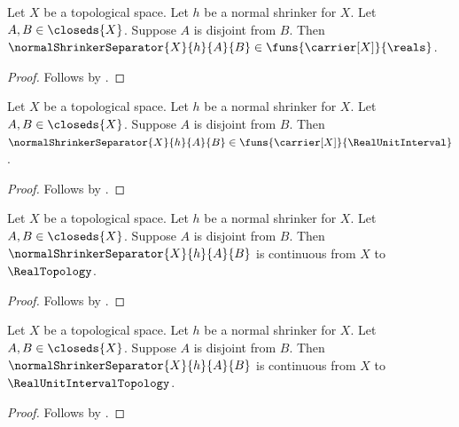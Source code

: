 \begin{theorem}\label{normal_shrinker_separator_typed_real}
    Let $X$ be a topological space.
    Let $h$ be a normal shrinker for $X$.
    Let $A,B\in\closeds{X}$.
    Suppose $A$ is disjoint from $B$.
    Then $\normalShrinkerSeparator{X}{h}{A}{B}
        \in\funs{\carrier[X]}{\reals}$.
\end{theorem}
\begin{proof}
    Follows by
        .
\end{proof}

\begin{theorem}\label{normal_shrinker_separator_typed_unit_interval}
    Let $X$ be a topological space.
    Let $h$ be a normal shrinker for $X$.
    Let $A,B\in\closeds{X}$.
    Suppose $A$ is disjoint from $B$.
    Then $\normalShrinkerSeparator{X}{h}{A}{B}
        \in\funs{\carrier[X]}{\RealUnitInterval}$.
\end{theorem}
\begin{proof}
    Follows by
        .
\end{proof}

\begin{theorem}\label{normal_shrinker_separator_continuous_real}
    Let $X$ be a topological space.
    Let $h$ be a normal shrinker for $X$.
    Let $A,B\in\closeds{X}$.
    Suppose $A$ is disjoint from $B$.
    Then $\normalShrinkerSeparator{X}{h}{A}{B}$ is continuous from
        $X$ to $\RealTopology$.
\end{theorem}
\begin{proof}
    Follows by
        .
\end{proof}

\begin{theorem}\label{normal_shrinker_separator_continuous_unit_interval}
    Let $X$ be a topological space.
    Let $h$ be a normal shrinker for $X$.
    Let $A,B\in\closeds{X}$.
    Suppose $A$ is disjoint from $B$.
    Then $\normalShrinkerSeparator{X}{h}{A}{B}$ is continuous from
        $X$ to $\RealUnitIntervalTopology$.
\end{theorem}
\begin{proof}
    Follows by
        .
\end{proof}

